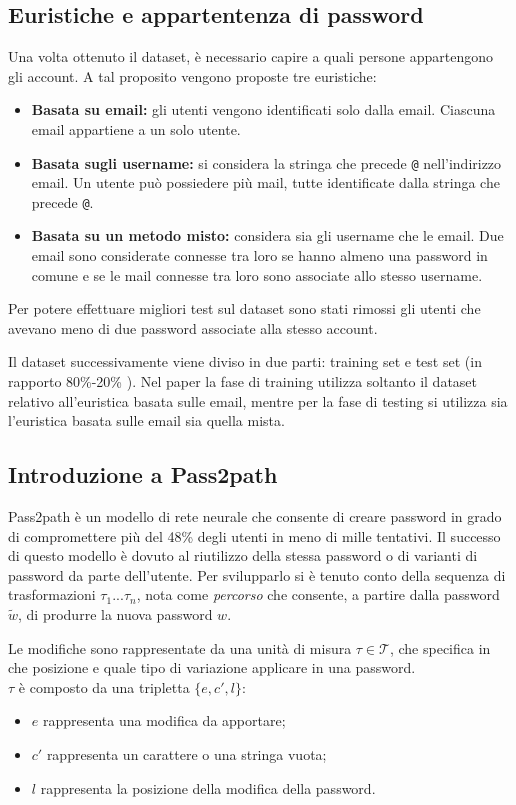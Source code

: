 \subsection{Euristiche e appartentenza di password}
Una volta ottenuto il dataset, è necessario capire a quali persone appartengono gli account. A tal proposito vengono proposte tre euristiche:
\begin{itemize}
    \item \textbf{Basata su email:} gli utenti vengono identificati solo dalla email. Ciascuna email appartiene a un solo utente.
    \item \textbf{Basata sugli username:} si considera la stringa che precede \texttt{@} nell'indirizzo email. Un utente può possiedere più mail, tutte identificate dalla stringa che precede \texttt{@}.
    \item \textbf{Basata su un metodo misto:} considera sia gli username che le email. Due email sono considerate connesse tra loro se hanno almeno una password in comune e se le mail connesse tra loro sono associate allo stesso username.
\end{itemize}
Per potere effettuare migliori test sul dataset sono stati rimossi gli utenti che avevano meno di due password associate alla stesso account.

Il dataset successivamente viene diviso in due parti: training set e test set (in rapporto 80\%-20\% ). Nel paper la fase di training utilizza soltanto il dataset relativo all'euristica basata sulle email, mentre per la fase di testing si utilizza sia l'euristica basata sulle email sia quella mista.

\subsection{Introduzione a Pass2path}

Pass2path è un modello di rete neurale che consente di creare password in grado di compromettere più del 48\% degli utenti in meno di mille tentativi. Il successo di questo modello è dovuto al riutilizzo della stessa password o di varianti di password da parte dell'utente.
Per svilupparlo si è tenuto conto della sequenza di trasformazioni $\tau_1...\tau_n $, nota come \emph{percorso} che consente, a partire dalla password  $\tilde{w}$, di produrre la nuova password $w$.


Le modifiche sono rappresentate da una unità di misura $\tau\in \mathcal{T}$, che specifica in che posizione e quale tipo di variazione applicare in una password.
\\
$\tau$ è composto da una tripletta  $\{e, c', l\}$:
\begin{itemize}
    \item $e$ rappresenta una modifica da apportare;
    \item $c'$ rappresenta un carattere o una stringa vuota;
    \item $l$ rappresenta la posizione della modifica della password.
\end{itemize}

